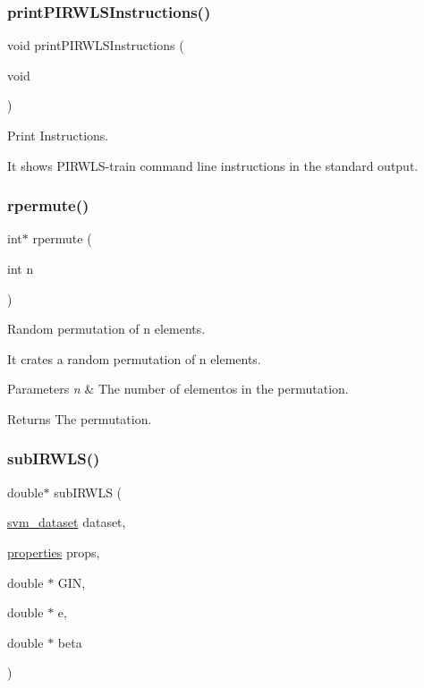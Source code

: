 \subsubsection{\texorpdfstring{print\+P\+I\+R\+W\+L\+S\+Instructions()}{printPIRWLSInstructions()}}
{\ttfamily void print\+P\+I\+R\+W\+L\+S\+Instructions (\begin{DoxyParamCaption}\item[{void}]{ }\end{DoxyParamCaption})}



Print Instructions. 

It shows P\+I\+R\+W\+L\+S-\/train command line instructions in the standard output. \hypertarget{PIRWLS-train_8h_a9e75aabe599f48c66cbda89320d68a71}{}\label{PIRWLS-train_8h_a9e75aabe599f48c66cbda89320d68a71} 
\subsubsection{\texorpdfstring{rpermute()}{rpermute()}}
{\ttfamily int$\ast$ rpermute (\begin{DoxyParamCaption}\item[{int}]{n }\end{DoxyParamCaption})}



Random permutation of n elements. 

It crates a random permutation of n elements.


\begin{DoxyParams}{Parameters}
{\em n} & The number of elementos in the permutation. \\
\hline
\end{DoxyParams}
\begin{DoxyReturn}{Returns}
The permutation. 
\end{DoxyReturn}
\hypertarget{PIRWLS-train_8h_af736cb71af5e7e4cb062977793905f4d}{}\label{PIRWLS-train_8h_af736cb71af5e7e4cb062977793905f4d} 
\subsubsection{\texorpdfstring{sub\+I\+R\+W\+L\+S()}{subIRWLS()}}
{\ttfamily double$\ast$ sub\+I\+R\+W\+LS (\begin{DoxyParamCaption}\item[{\hyperlink{structsvm__dataset}{svm\+\_\+dataset}}]{dataset,  }\item[{\hyperlink{structproperties}{properties}}]{props,  }\item[{double $\ast$}]{G\+IN,  }\item[{double $\ast$}]{e,  }\item[{double $\ast$}]{beta }\end{DoxyParamCaption})}



